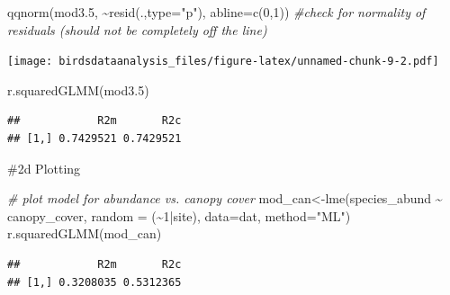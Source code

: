 \documentclass[
]{article}
\newenvironment{Shaded}{\begin{snugshade}}{\end{snugshade}}
\newcommand{\AttributeTok}[1]{\textcolor[rgb]{0.77,0.63,0.00}{#1}}
\newcommand{\CommentTok}[1]{\textcolor[rgb]{0.56,0.35,0.01}{\textit{#1}}}
\newcommand{\DecValTok}[1]{\textcolor[rgb]{0.00,0.00,0.81}{#1}}
\newcommand{\FloatTok}[1]{\textcolor[rgb]{0.00,0.00,0.81}{#1}}
\newcommand{\FunctionTok}[1]{\textcolor[rgb]{0.00,0.00,0.00}{#1}}
\newcommand{\NormalTok}[1]{#1}
\newcommand{\OtherTok}[1]{\textcolor[rgb]{0.56,0.35,0.01}{#1}}
\newcommand{\SpecialCharTok}[1]{\textcolor[rgb]{0.00,0.00,0.00}{#1}}
\newcommand{\StringTok}[1]{\textcolor[rgb]{0.31,0.60,0.02}{#1}}
\begin{document}
\begin{Shaded}
\begin{Highlighting}[]
\FunctionTok{qqnorm}\NormalTok{(mod3}\FloatTok{.5}\NormalTok{, }\SpecialCharTok{\textasciitilde{}}\FunctionTok{resid}\NormalTok{(.,}\AttributeTok{type=}\StringTok{"p"}\NormalTok{), }\AttributeTok{abline=}\FunctionTok{c}\NormalTok{(}\DecValTok{0}\NormalTok{,}\DecValTok{1}\NormalTok{)) }\CommentTok{\#check for normality of residuals (should not be completely off the line)}
\end{Highlighting}
\end{Shaded}

\texttt{[image: birdsdataanalysis\_files/figure-latex/unnamed-chunk-9-2.pdf]}

\begin{Shaded}
\begin{Highlighting}[]
\FunctionTok{r.squaredGLMM}\NormalTok{(mod3}\FloatTok{.5}\NormalTok{)}
\end{Highlighting}
\end{Shaded}

\begin{verbatim}
##            R2m       R2c
## [1,] 0.7429521 0.7429521
\end{verbatim}

\#2d Plotting

\begin{Shaded}
\begin{Highlighting}[]
\CommentTok{\# plot model for abundance vs. canopy cover}
\NormalTok{mod\_can}\OtherTok{\textless{}{-}}\FunctionTok{lme}\NormalTok{(species\_abund }\SpecialCharTok{\textasciitilde{}}\NormalTok{ canopy\_cover, }\AttributeTok{random =}\NormalTok{ (}\SpecialCharTok{\textasciitilde{}}\DecValTok{1}\SpecialCharTok{|}\NormalTok{site), }\AttributeTok{data=}\NormalTok{dat, }\AttributeTok{method=}\StringTok{"ML"}\NormalTok{)}
\FunctionTok{r.squaredGLMM}\NormalTok{(mod\_can)}
\end{Highlighting}
\end{Shaded}

\begin{verbatim}
##            R2m       R2c
## [1,] 0.3208035 0.5312365
\end{verbatim}
\end{document}

